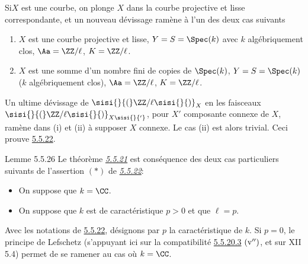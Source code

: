 \documentclass[10pt]{../fichiers-configuration-latex/smfart}
\begin{document}
Si\pageoriginale $X$ est une courbe, on plonge $X$ dans la courbe
projective et lisse correspondante, et un nouveau dévissage ramène à
l'un des deux cas suivants
\begin{enumerate}
\renewcommand{\theenumi}{\roman{enumi}}
\renewcommand{\labelenumi}{(\theenumi)}
\item $X$ est une courbe projective et lisse, $Y=S=\Spec(k)$ avec $k$
algébriquement clos, $\Aa=\ZZ/\ell$, $K=\ZZ/\ell$.

\item $X$ est une somme d'un nombre fini de copies de $\Spec(k)$,
$Y=S=\Spec(k)$ ($k$ algébriquement clos),
$\Aa=\ZZ/\ell$, $K=\ZZ/\ell$.
\end{enumerate}

Un ultime dévissage de $\sisi{}{(}\ZZ/\ell\sisi{}{)}_{X}$ en les faisceaux
$\sisi{}{(}\ZZ/\ell\sisi{}{)}_{X\sisi{}{'}}$, pour $X'$ composante connexe de $X$, ramène dans
(i) et (ii) à supposer $X$ connexe. Le cas (ii) est alors
trivial. Ceci prouve \hyperref[XVII.lem5.5.22]{5.5.22}.

\begin{enonce*}{Lemme 5.5.26}
Le théorème \emph{\hyperref[XVII.thm5.5.21]{5.5.21}} est conséquence des deux cas particuliers
suivants de l'assertion $(\ast)$ de \emph{\hyperref[XVII.lem5.5.22]{5.5.22}}:
\begin{itemize}
\item[\emph{Cas} 1.] On suppose que $k=\CC$.

\item[\emph{Cas} 2.] On suppose que $k$ est de caractéristique $p>0$
et que $\ell=p$.
\end{itemize}
\end{enonce*}

Avec les notations de \hyperref[XVII.lem5.5.22]{5.5.22}, désignons par $p$ la caractéristique de
$k$. Si $p=0$, le principe de Lefschetz (s'appuyant ici sur la
compatibilité \hyperref[XVII.par5.5.20.3]{5.5.20.3} ${\rm(v'')}$, et sur XII 5.4) permet de se
ramener au cas où $k=\CC$.
\end{document}
